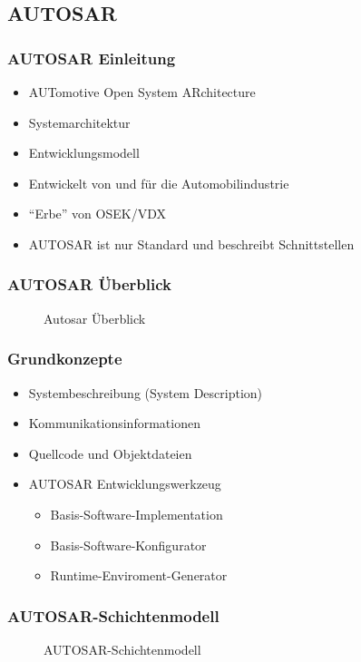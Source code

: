 \documentclass[]{beamer}
\newcommand{\inputImage}[1]{}
\begin{document}
\subsection{AUTOSAR}

\begin{frame}
\frametitle{AUTOSAR Einleitung}
    \begin{itemize}
        \item AUTomotive Open System ARchitecture
        \item Systemarchitektur
        \item Entwicklungsmodell
        \item Entwickelt von und für die Automobilindustrie
        \item "`Erbe"' von OSEK/VDX
        \item AUTOSAR ist nur Standard und beschreibt Schnittstellen
    \end{itemize}
\end{frame}

\begin{frame}[plain]
\frametitle{AUTOSAR Überblick}
    \begin{figure}[p]
        \centering
        \resizebox{0.6\linewidth}{!}{\inputImage{autosar_overview.dia}}
        \caption{Autosar Überblick}
        \label{fig:autosar_overview}
    \end{figure}
\end{frame}

\begin{frame}
\frametitle{Grundkonzepte}
    \begin{itemize}
        \item Systembeschreibung (System Description)
        \item Kommunikationsinformationen
        \item Quellcode und Objektdateien
        \item AUTOSAR Entwicklungswerkzeug
        \begin{itemize}
            \item Basis-Software-Implementation
            \item Basis-Software-Konfigurator
            \item Runtime-Enviroment-Generator
        \end{itemize}
    \end{itemize}
\end{frame}


\begin{frame}
\frametitle{AUTOSAR-Schichtenmodell}
    \begin{figure}[ht]
        \centering
        \resizebox{0.98\linewidth}{!}{\inputImage{autosar_layer.dia}}
        \caption{AUTOSAR-Schichtenmodell}
        \label{fig:autosar_layer}
    \end{figure}
\end{frame}
\end{document}
